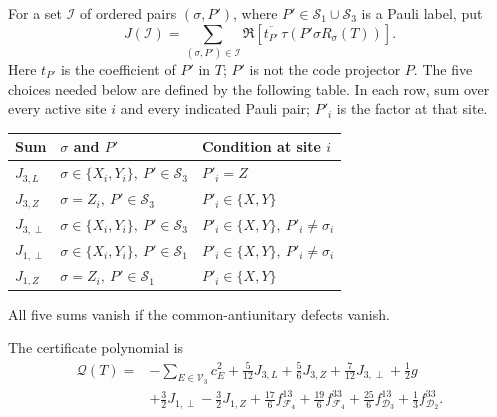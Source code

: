 \documentclass[11pt]{article}
\theoremstyle{definition}
\begin{document}
For a set \(\mathcal I\) of ordered pairs \((\sigma,P')\), where
\(P'\in\mathcal S_1\cup\mathcal S_3\) is a Pauli label, put
\begin{equation}
 J(\mathcal I)=
 \sum_{(\sigma,P')\in\mathcal I}
 \Re\!\left[\overline{t_{P'}}\,
        \tau\!\left(P'\sigma R_\sigma(T)\right)\right].
 \label{o2gc:J-contraction}
\end{equation}
Here \(t_{P'}\) is the coefficient of \(P'\) in \(T\); \(P'\) is not
the code projector \(P\). The five choices needed below are defined
by the following table. In each row, sum over every active site \(i\)
and every indicated Pauli pair; \(P'_i\) is the factor at that site.
\begin{center}
\begin{tabular}{@{}lll@{}}
\toprule
Sum & \(\sigma\) and \(P'\) & Condition at site \(i\)\\
\midrule
\(J_{3,L}\) &
\(\sigma\in\{X_i,Y_i\},\ P'\in\mathcal S_3\) & \(P'_i=Z\)\\
\(J_{3,Z}\) &
\(\sigma=Z_i,\ P'\in\mathcal S_3\) & \(P'_i\in\{X,Y\}\)\\
\(J_{3,\perp}\) &
\(\sigma\in\{X_i,Y_i\},\ P'\in\mathcal S_3\) &
\(P'_i\in\{X,Y\},\ P'_i\ne\sigma_i\)\\
\(J_{1,\perp}\) &
\(\sigma\in\{X_i,Y_i\},\ P'\in\mathcal S_1\) &
\(P'_i\in\{X,Y\},\ P'_i\ne\sigma_i\)\\
\(J_{1,Z}\) &
\(\sigma=Z_i,\ P'\in\mathcal S_1\) & \(P'_i\in\{X,Y\}\)\\
\bottomrule
\end{tabular}
\end{center}
All five sums vanish if the common-antiunitary defects vanish.

The certificate polynomial is
\begin{align}
 \mathcal Q(T)={}&-\sum_{E\in\mathcal V_3}c_E^2
 +\frac5{12}J_{3,L}+\frac56J_{3,Z}
 +\frac7{12}J_{3,\perp}+\frac12g\nonumber\\
 &+\frac32J_{1,\perp}-\frac32J_{1,Z}
 +\frac{17}{6}f_{\mathcal F_4}^{13}
 +\frac{19}{6}f_{\mathcal F_4}^{33}
 +\frac{25}{6}f_{\mathcal D_3}^{13}
 +\frac13f_{\mathcal D_2}^{33}.
 \label{o2gc:Q}
\end{align}
\end{document}
